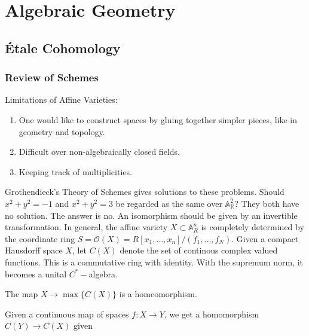 \documentclass[crop=false,class=article,oneside]{standalone}
\begin{document}
    \ifx\ifsub\undefined
        \section*{Algebraic Geometry}
        \setcounter{section}{1}
    \fi
    \subsection{\'{E}tale Cohomology}
        \subsubsection{Review of Schemes}
            \begin{remark}
                Limitations of Affine Varieties:
                \begin{enumerate}
                    \item One would like to construct spaces
                          by gluing together simpler pieces,
                          like in geometry and topology.
                    \item Difficult over non-algebraically
                          closed fields.
                    \item Keeping track of multiplicities.
                \end{enumerate}
            \end{remark}
            Grothendieck's Theory of Schemes gives solutions to
            these problems. Should $x^{2}+y^{2}=-1$ and
            $x^{2}+y^{2}=3$ be regarded as the same over
            $\mathbb{A}_{\mathbb{R}}^{2}$? They both have no
            solution. The answer is no. An isomorphism should
            be given by an invertible transformation. In general,
            the affine variety $X\subset\mathbb{A}_{R}^n$ is
            completely determined by the coordinate ring
            $S=\mathcal{O}(X)%
              =R[x_{1},\hdots,x_{n}]/(f_{1},\hdots,f_{N})$.
            Given a compact Hausdorff space $X$, let $C(X)$
            denote the set of continous complex valued functions.
            This is a commutative ring with identity. With the
            supremum norm, it becomes a unital $C^{*}-$algebra.
            \begin{theorem}
                The map $X\rightarrow\max\{C(X)\}$
                is a homeomorphism.
            \end{theorem}
            Given a continuous map of spaces $f:X\rightarrow Y$,
            we get a homomorphism $C(Y)\rightarrow C(X)$ given
\end{document}
